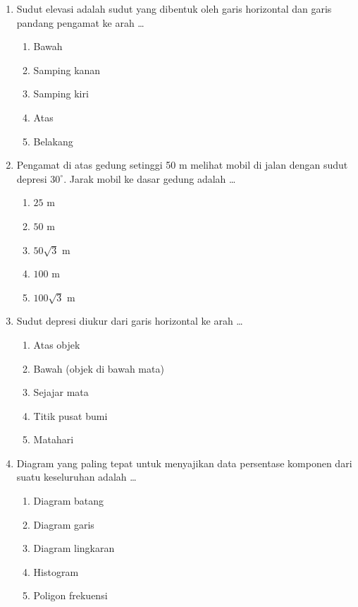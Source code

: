 \documentclass[12pt,a4paper]{article}
\begin{document}
\begin{enumerate}[leftmargin=*]
\item Sudut elevasi adalah sudut yang dibentuk oleh garis horizontal dan garis pandang pengamat ke arah \dots
    \begin{enumerate}[label=\alph*.]
        \item Bawah
        \item Samping kanan
        \item Samping kiri
        \item Atas
        \item Belakang
    \end{enumerate}

\item Pengamat di atas gedung setinggi 50 m melihat mobil di jalan dengan sudut depresi $30^\circ$. Jarak mobil ke dasar gedung adalah \dots
    \begin{enumerate}[label=\alph*.]
        \item $25$ m
        \item $50$ m
        \item $50\sqrt{3}$ m
        \item $100$ m
        \item $100\sqrt{3}$ m
    \end{enumerate}

\item Sudut depresi diukur dari garis horizontal ke arah \dots
    \begin{enumerate}[label=\alph*.]
        \item Atas objek
        \item Bawah (objek di bawah mata)
        \item Sejajar mata
        \item Titik pusat bumi
        \item Matahari
    \end{enumerate}

\item Diagram yang paling tepat untuk menyajikan data persentase komponen dari suatu keseluruhan adalah \dots
    \begin{enumerate}[label=\alph*.]
        \item Diagram batang
        \item Diagram garis
        \item Diagram lingkaran
        \item Histogram
        \item Poligon frekuensi
    \end{enumerate}


\end{enumerate}
\end{document}
